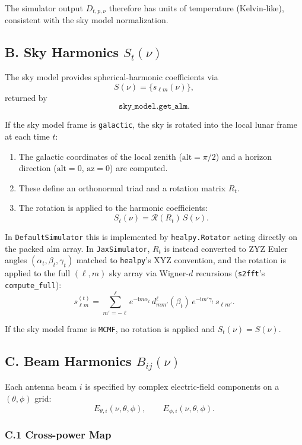 \documentclass[11pt]{article}
\newcommand{\ii}{\mathrm{i}}
\begin{document}
The simulator output $D_{t,p,\nu}$ therefore has units of temperature (Kelvin-like), consistent with the sky model normalization.

\subsection*{B. Sky Harmonics $S_t(\nu)$}

The sky model provides spherical-harmonic coefficients via
\[
S(\nu) = \{ s_{\ell m}(\nu) \},
\]
returned by
\[
\texttt{sky\_model.get\_alm}.
\]

If the sky model frame is \texttt{galactic}, the sky is rotated into the local lunar frame at each time $t$:

\begin{enumerate}
\item The galactic coordinates of the local zenith ($\mathrm{alt}=\pi/2$) and a horizon direction ($\mathrm{alt}=0$, $\mathrm{az}=0$) are computed.
\item These define an orthonormal triad and a rotation matrix $R_t$.
\item The rotation is applied to the harmonic coefficients:
\[
S_t(\nu) = \mathcal{R}(R_t)\,S(\nu).
\]
\end{enumerate}

In \texttt{DefaultSimulator} this is implemented by \texttt{healpy.Rotator} acting directly on the packed alm array. In \texttt{JaxSimulator}, $R_t$ is instead converted to ZYZ Euler angles $(\alpha_t,\beta_t,\gamma_t)$ matched to \texttt{healpy}'s XYZ convention, and the rotation is applied to the full $(\ell,m)$ sky array via Wigner-$d$ recursions (\texttt{s2fft}'s \texttt{compute\_full}):
\[
s_{\ell m}^{(t)}
=
\sum_{m'=-\ell}^{\ell}
e^{-\ii m\alpha_t}\,
d^{\ell}_{m m'}(\beta_t)\,
e^{-\ii m'\gamma_t}\,
s_{\ell m'}.
\]

If the sky model frame is \texttt{MCMF}, no rotation is applied and $S_t(\nu)=S(\nu)$.

\subsection*{C. Beam Harmonics $B_{ij}(\nu)$}

Each antenna beam $i$ is specified by complex electric-field components on a $(\theta,\phi)$ grid:
\[
E_{\theta,i}(\nu,\theta,\phi),
\qquad
E_{\phi,i}(\nu,\theta,\phi).
\]

\subsubsection*{C.1 Cross-power Map}
\end{document}
